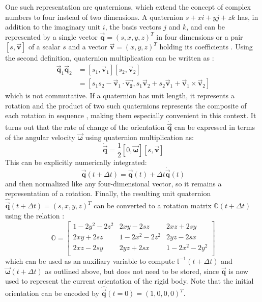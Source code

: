 \documentclass[oneside, a4paper]{book}
\newcommand\vek[1]{\vec{\bm{#1}}}
\newcommand\br[1]{\left(#1\right)}
\begin{document}
    One such representation are quaternions, which extend the concept of complex numbers to four instead of two dimensions. A quaternion $s + x i + y j + z k$ has, in addition to the imaginary unit $i$, the basis vectors $j$ and $k$, and can be represented by a single vector $\vek{q} = \br{s,x,y,z}^T$ in four dimensions or a pair $\left[s,\vek{v}\right]$ of a scalar $s$ and a vector $\vek{v}=\br{x,y,z}^T$ holding its coefficients \autocite{physically-based-rigids}. Using the second definition, quaternion multiplication can be written as \autocite{physically-based-rigids}:
    \begin{align}
      \vek{q}_1 \vek{q}_2 
      &= \left[s_1,\vek{v}_1\right] \left[s_2,\vek{v}_2\right] \\
      &= \left[s_1 s_2 - \vek{v}_1 \cdot \vek{v_2}, s_1\vek{v}_2 + s_2\vek{v}_1 + \vek{v}_1 \times \vek{v}_2 \right]
    \end{align}
    which is not commutative. If a quaternion has unit length, it represents a rotation and the product of two such quaternions represents the composite of each rotation in sequence \autocite{physically-based-rigids}, making them especially convenient in this context. It turns out that the rate of change of the orientation $\dot{\vek{q}}$ can be expressed in terms of the angular velocity $\vek{\omega}$ using quaternion multiplication as:
    \begin{equation}\label{eq:rigid-quaternion-qdot}
      \dot{\vek{q}} = \frac{1}{2} \left[0,\vek{\omega}\right]\left[s,\vek{v}\right] 
    \end{equation}
   This can be explicitly numerically integrated:
    \begin{equation}\label{eq:rigid-qdot-integration}
      \vek{q}\br{t+\Delta t} = \vek{q}\br{t} + \Delta t\dot{\vek{q}}\br{t}
    \end{equation}
    and then normalized like any four-dimensional vector, so it remains a representation of a rotation. Finally, the resulting unit quaternion $\hat{\vek{q}}\br{t+\Delta t}=\br{s,x,y,z}^T$ can be converted to a rotation matrix $\mathds{O}\br{t+\Delta t}$  using the relation \autocite{physically-based-rigids}:
    \begin{equation}\label{eq:rigid-quaternion-to-matrix}
      \mathds{O} = \begin{bmatrix}
        1-2y^2-2z^2 & 2xy-2sz & 2xz+2sy\\
        2xy+2sz & 1-2x^2-2z^2 & 2yz-2sx\\
        2xz-2sy & 2yz+2sx & 1-2x^2-2y^2\\
      \end{bmatrix}
    \end{equation}
    which can be used as an auxiliary variable to compute $\mathds{I}^{-1}\br{t+\Delta t}$ and $\vek{\omega}\br{t+\Delta t}$ as outlined above, but does not need to be stored, since $\vek{q}$ is now used to represent the current orientation of the rigid body. Note that the initial orientation can be encoded by $\hat{\vek{q}}\br{t=0} = \br{1,0,0,0}^T$.
\end{document}
